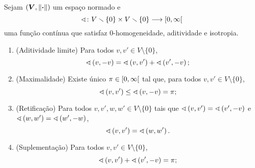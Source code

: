 \begin{proposition}
Sejam $(\bm V, \left\Vert{\bm{\cdot}}\right\Vert)$ um espaço normado e
	\begin{equation*}
	\sphericalangle\colon \allowbreak V \smallsetminus \{0\} \times V \smallsetminus \{0\} \longrightarrow \left[0,\allowbreak \infty\right[
	\end{equation*}
uma função contínua que satisfaz $0$-homogeneidade, aditividade e isotropia.
	\begin{enumerate}
	\item (Aditividade limite) Para todos $v,v' \in V \setminus \{0\}$,
		\begin{equation*}
		\sphericalangle\left({v},{-v}\right) = \sphericalangle\left({v},{v'}\right) + \sphericalangle\left({v'},{-v}\right);
		\end{equation*}
	\item (Maximalidade) Existe único $\pi \in \left[0,\allowbreak \infty\right[$ tal que, para todos $v,v' \in V \setminus \{0\}$,
		\begin{equation*}
		\sphericalangle\left({v},{v'}\right) \leq \sphericalangle\left({v},{-v}\right) = \pi;
		\end{equation*}
	\item (Retificação) Para todos $v,v',w,w' \in V \setminus \{0\}$ tais que $\sphericalangle\left({v},{v'}\right) = \sphericalangle\left({v'},{-v}\right)$ e $\sphericalangle\left({w},{w'}\right) = \sphericalangle\left({w'},{-w}\right)$,
		\begin{equation*}
		\sphericalangle\left({v},{v'}\right) = \sphericalangle\left({w},{w'}\right).
		\end{equation*}
	\item (Suplementação) Para todos $v,v' \in V \setminus \{0\}$,
		\begin{equation*}
		\sphericalangle\left({v},{v'}\right) + \sphericalangle\left({v'},{-v}\right) = \pi;
		\end{equation*}
	\end{enumerate}
\end{proposition}
